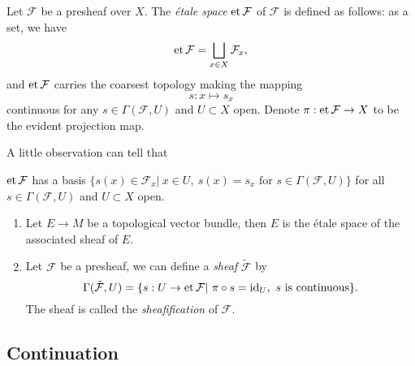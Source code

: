 \begin{defn}
    Let $\mathcal{F}$ be a presheaf over $X$.
    The \emph{\'etale space} $\operatorname{et}\mathcal{F}$ of $\mathcal{F}$ is defined as follows:
    as a set, we have
    \[\operatorname{et}\mathcal{F}=\bigsqcup_{x\in X}\mathcal{F}_x,\]
    and $\operatorname{et}\mathcal{F}$ carries the coarsest topology making the mapping
    \[s:x\mapsto s_x\]
    continuous for any $s\in\Gamma(\mathcal{F},U)$ and $U\subset X$ open.
    Denote $\pi:\operatorname{et}\mathcal{F}\to X$ to be the evident projection map.
\end{defn}

A little observation can tell that
\begin{prop}
    $\operatorname{et}\mathcal{F}$ has a basis $\{s(x)\in\mathcal{F}_x|\ x\in U,\ s(x)=s_x\text{ for }s\in\Gamma(\mathcal{F},U)\}$ for all $s\in\Gamma(\mathcal{F},U)$ and $U\subset X$ open.
\end{prop}

\begin{eg}
    \begin{enumerate}[(1)]
        \item Let $E\to M$ be a topological vector bundle, then $E$ is the \'etale space of the associated sheaf of $E$.
        \item Let $\mathcal{F}$ be a presheaf, we can define a \emph{sheaf} $\tilde{\mathcal{F}}$ by
        \[\Gamma(\tilde{\mathcal{F}},U)=\{s:U\to\et\mathcal{F}|\ \pi\circ s=\operatorname{id}_U,\ s\text{ is continuous}\}.\]
        The sheaf is called the \emph{sheafification} of $\mathcal{F}$.
    \end{enumerate}
\end{eg}

\subsection*{Continuation}

